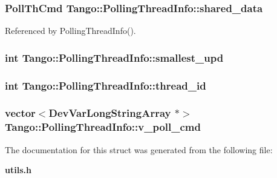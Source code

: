 \subsubsection[{shared\-\_\-data}]{\setlength{\rightskip}{0pt plus 5cm}Poll\-Th\-Cmd Tango\-::\-Polling\-Thread\-Info\-::shared\-\_\-data}\label{structTango_1_1PollingThreadInfo_a34ac72f11342fa6246db3ff04c8dc032}


Referenced by Polling\-Thread\-Info().

\subsubsection[{smallest\-\_\-upd}]{\setlength{\rightskip}{0pt plus 5cm}int Tango\-::\-Polling\-Thread\-Info\-::smallest\-\_\-upd}\label{structTango_1_1PollingThreadInfo_a04264b5d754e7559ad8ad67fff69a110}
\subsubsection[{thread\-\_\-id}]{\setlength{\rightskip}{0pt plus 5cm}int Tango\-::\-Polling\-Thread\-Info\-::thread\-\_\-id}\label{structTango_1_1PollingThreadInfo_a0ed194258705e10b4b4b8b132e4687dd}
\subsubsection[{v\-\_\-poll\-\_\-cmd}]{\setlength{\rightskip}{0pt plus 5cm}vector$<$Dev\-Var\-Long\-String\-Array $\ast$$>$ Tango\-::\-Polling\-Thread\-Info\-::v\-\_\-poll\-\_\-cmd}\label{structTango_1_1PollingThreadInfo_a8b8d1a40cf642511070d7fb097f74a28}


The documentation for this struct was generated from the following file\-:\begin{DoxyCompactItemize}
\item 
{\bf utils.\-h}\end{DoxyCompactItemize}
